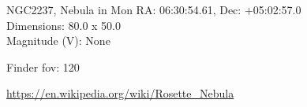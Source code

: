 \begin{block}{NGC2237, Nebula in Mon}
    RA: 06:30:54.61, Dec: +05:02:57.0 \\ 
    Dimensions: 80.0 x 50.0 \\ 
    Magnitude (V): None



    Finder fov: 120 

    \url{https://en.wikipedia.org/wiki/Rosette_Nebula} 
\end{block}